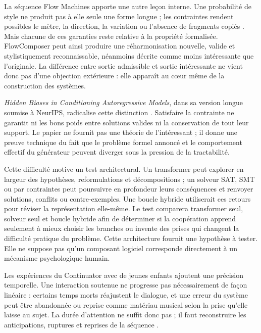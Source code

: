 \documentclass[11pt,a4paper]{article}
\begin{document}
La séquence Flow Machines apporte une autre leçon interne. Une probabilité de style
ne produit pas à elle seule une forme longue ; les contraintes rendent possibles le
mètre, la direction, la variation ou l'absence de fragments copiés
\parencite{pachet2011markov,barbieri2012lyrics,papadopoulos2014avoiding,
papadopoulos2016nonplagiaristic,papadopoulos2016flowcomposer,
pachet2017variations}. Mais chacune de ces garanties reste relative à la propriété
formalisée. FlowComposer peut ainsi produire une réharmonisation nouvelle, valide et
stylistiquement reconnaissable, néanmoins décrite comme moins intéressante que
l'originale. La différence entre sortie admissible et sortie intéressante ne vient
donc pas d'une objection extérieure : elle apparaît au cœur même de la construction
des systèmes.

\emph{Hidden Biases in Conditioning Autoregressive Models}, dans sa version
longue soumise à NeurIPS, radicalise cette distinction
\parencite{pachet2026biases}. Satisfaire la contrainte ne garantit ni les bons
poids entre solutions valides ni la conservation de tout leur support. Le papier
ne fournit pas une théorie de l'intéressant ; il donne une preuve technique du
fait que le problème formel annoncé et le comportement effectif du générateur
peuvent diverger sous la pression de la tractabilité.

Cette difficulté motive un test architectural. Un transformer peut explorer en
largeur des hypothèses, reformulations et décompositions ; un solveur SAT, SMT ou
par contraintes peut poursuivre en profondeur leurs conséquences et renvoyer
solutions, conflits ou contre-exemples. Une boucle hybride utiliserait ces
retours pour réviser la représentation elle-même. Le test comparera transformer
seul, solveur seul et boucle hybride afin de déterminer si la coopération apprend
seulement à mieux choisir les branches ou invente des prises qui changent la
difficulté pratique du problème. Cette architecture fournit une hypothèse à
tester. Elle ne suppose pas qu'un composant logiciel corresponde directement à
un mécanisme psychologique humain.

Les expériences du Continuator avec de jeunes enfants ajoutent une précision
temporelle. Une interaction soutenue ne progresse pas nécessairement de façon
linéaire : certains temps morts réajustent le dialogue, et une erreur du système
peut être abandonnée ou reprise comme matériau musical selon la prise qu'elle
laisse au sujet. La durée d'attention ne suffit donc pas ; il faut reconstruire
les anticipations, ruptures et reprises de la séquence
\parencite{addessi2005experiments,addessi2006flowmachine}.
\end{document}
